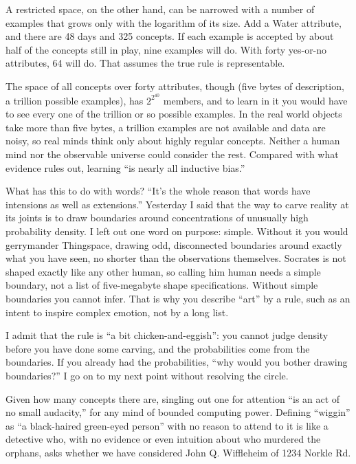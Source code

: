 A restricted space, on the other hand, can be narrowed with a number of examples that grows only with the logarithm of its size. Add a Water attribute, and there are 48 days and 325 concepts. If each example is accepted by about half of the concepts still in play, nine examples will do. With forty yes-or-no attributes, 64 will do.  That assumes the true rule is representable.

The space of all concepts over forty attributes, though (five bytes of description, a trillion possible examples), has $2^{2^{40}}$ members, and to learn in it you would have to see every one of the trillion or so possible examples. In the real world objects take more than five bytes, a trillion examples are not available and data are noisy, so real minds think only about highly regular concepts. Neither a human mind nor the observable universe could consider the rest. Compared with what evidence rules out, learning ``is nearly all inductive bias.'' 

What has this to do with words? ``It's the whole reason that words have intensions as well as extensions.'' Yesterday I said that the way to carve reality at its joints is to draw boundaries around concentrations of unusually high probability density. I left out one word on purpose: simple. Without it you would gerrymander Thingspace, drawing odd, disconnected boundaries around exactly what you have seen, no shorter than the observations themselves. Socrates is not shaped exactly like any other human, so calling him human needs a simple boundary, not a list of five-megabyte shape specifications. Without simple boundaries you cannot infer. That is why you describe ``art'' by a rule, such as an intent to inspire complex emotion, not by a long list.

I admit that the rule is ``a bit chicken-and-eggish'': you cannot judge density before you have done some carving, and the probabilities come from the boundaries. If you already had the probabilities, ``why would you bother drawing boundaries?''  I go on to my next point without resolving the circle.

Given how many concepts there are, singling out one for attention ``is an act of no small audacity,'' for any mind of bounded computing power. Defining ``wiggin'' as ``a black-haired green-eyed person'' with no reason to attend to it is like a detective who, with no evidence or even intuition about who murdered the orphans, asks whether we have considered John Q. Wiffleheim of 1234 Norkle Rd.
